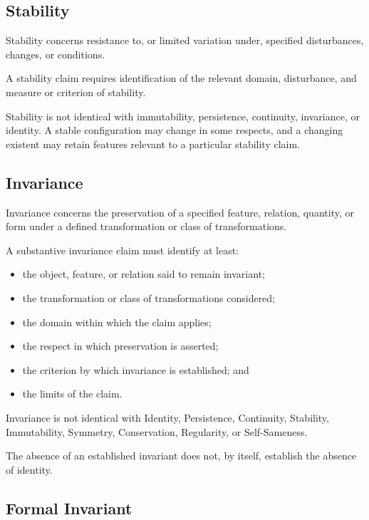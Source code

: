 \subsection*{Stability}

Stability concerns resistance to, or limited variation under, specified
disturbances, changes, or conditions.

A stability claim requires identification of the relevant domain,
disturbance, and measure or criterion of stability.

Stability is not identical with immutability, persistence, continuity,
invariance, or identity. A stable configuration may change in some
respects, and a changing existent may retain features relevant to
a particular stability claim.


\subsection*{Invariance}

Invariance concerns the preservation of a specified feature, relation,
quantity, or form under a defined transformation or class of
transformations.

A substantive invariance claim must identify at least:

\begin{itemize}
    \item the object, feature, or relation said to remain invariant;
    \item the transformation or class of transformations considered;
    \item the domain within which the claim applies;
    \item the respect in which preservation is asserted;
    \item the criterion by which invariance is established; and
    \item the limits of the claim.
\end{itemize}

Invariance is not identical with Identity, Persistence, Continuity,
Stability, Immutability, Symmetry, Conservation, Regularity, or
Self-Sameness.

The absence of an established invariant does not, by itself, establish
the absence of identity.


\subsection*{Formal Invariant}

